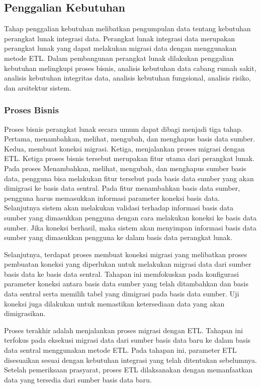 \subsection{Penggalian Kebutuhan}
Tahap penggalian kebutuhan melibatkan pengumpulan data tentang kebutuhan perangkat lunak integrasi data. Perangkat lunak integrasi data merupakan perangkat lunak yang dapat melakukan migrasi data dengan menggunakan metode ETL. Dalam pembangunan perangkat lunak dilakukan penggalian kebutuhan melingkupi proses bisnis, analisis kebutuhan data cabang rumah sakit, analisis kebutuhan integritas data, analisis kebutuhan fungsional, analisis risiko, dan arsitektur sistem.

\subsubsection{Proses Bisnis}
Proses bisnis perangkat lunak secara umum dapat dibagi menjadi tiga tahap. Pertama, menambahkan, melihat, mengubah, dan menghapus basis data sumber. Kedua, membuat koneksi migrasi. Ketiga, menjalankan proses migrasi dengan ETL. Ketiga proses bisnis tersebut merupakan fitur utama dari perangkat lunak. Pada proses Menambahkan, melihat, mengubah, dan menghapus sumber basis data, pengguna bisa melakukan fitur tersebut pada basis data sumber yang akan dimigrasi ke basis data sentral. Pada fitur menambahkan basis data sumber, pengguna harus memasukkan informasi parameter koneksi basis data. Selanjutnya sistem akan melakukan validasi terhadap informasi basis data sumber yang dimasukkan pengguna dengan cara melakukan koneksi ke basis data sumber. Jika koneksi berhasil, maka sistem akan menyimpan informasi basis data sumber yang dimasukkan pengguna ke dalam basis data perangkat lunak.

Selanjutnya, terdapat proses membuat koneksi migrasi yang melibatkan proses pembuatan koneksi yang diperlukan untuk melakukan migrasi data dari sumber basis data ke basis data sentral. Tahapan ini memfokuskan pada konfigurasi parameter koneksi antara basis data sumber yang telah ditambahkan dan basis data sentral serta memilih tabel yang dimigrasi pada basis data sumber. Uji koneksi juga dilakukan untuk memastikan ketersediaan data yang akan dimigrasikan.

Proses terakhir adalah menjalankan proses migrasi dengan ETL. Tahapan ini terfokus pada eksekusi migrasi data dari sumber basis data baru ke dalam basis data sentral menggunakan metode ETL. Pada tahapan ini, parameter ETL disesuaikan sesuai dengan kebutuhan integrasi yang telah ditentukan sebelumnya. Setelah pemeriksaan prasyarat, proses ETL dilaksanakan dengan memanfaatkan data yang tersedia dari sumber basis data baru.


